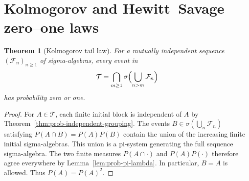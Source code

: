 \documentclass[11pt,oneside,openany]{book}
\theoremstyle{plain}
\newtheorem{theorem}{Theorem}[chapter]
\theoremstyle{definition}
\theoremstyle{remark}
\begin{document}
\section{Kolmogorov and Hewitt--Savage zero--one laws}
\label{p02-05}

\begin{theorem}[Kolmogorov tail law]
\label{thm:prob-tail-zero-one}
For a mutually independent sequence \((\mathcal F_n)_{n\ge1}\) of
sigma-algebras, every event in
\[
 \mathcal T=\bigcap_{m\ge1}\sigma\Bigl(\bigcup_{n>m}\mathcal F_n\Bigr)
\]
has probability zero or one.
\end{theorem}
\begin{proof}
For \(A\in\mathcal T\), each finite initial block is independent of
\(A\) by Theorem~\ref{thm:prob-independent-grouping}. The events
\(B\in\sigma(\bigcup_n\mathcal F_n)\) satisfying
\(P(A\cap B)=P(A)P(B)\) contain the union of the increasing finite
initial sigma-algebras. This union is a pi-system generating the
full sequence sigma-algebra. The two finite measures
\(P(A\cap\cdot)\) and \(P(A)P(\cdot)\) therefore agree everywhere by
Lemma~\ref{lem:prob-pi-lambda}. In particular, \(B=A\) is allowed.
Thus \(P(A)=P(A)^2\).
\end{proof}
\end{document}
